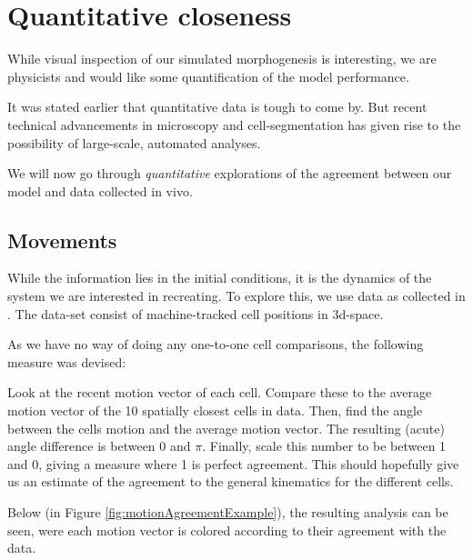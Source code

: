 \section{Quantitative closeness}
While visual inspection of our simulated morphogenesis is interesting, we are physicists and would like some quantification of the model performance.

It was stated earlier that quantitative data is tough to come by. But recent technical advancements in microscopy and cell-segmentation has given rise to the possibility of large-scale, automated analyses.\cite{stern2022deconstructing}

We will now go through \textit{quantitative} explorations of the agreement between our model and data collected in vivo. 


\subsection{Movements}

While the information lies in the initial conditions, it is the dynamics of the system we are interested in recreating. To explore this, we use data as collected in . 
The data-set consist of machine-tracked cell positions in 3d-space.

As we have no way of doing any one-to-one cell comparisons, the following measure was devised: 

Look at the recent motion vector of each cell. Compare these to the average motion vector of the 10 spatially closest cells in data. 
Then, find the angle between the cells motion and the average motion vector. The resulting (acute) angle difference is between 0 and $\pi$. Finally, scale this number to be between 1 and 0, giving a measure where 1 is perfect agreement.
This should hopefully give us an estimate of the agreement to the general kinematics for the different cells.

Below (in Figure  \ref{fig:motionAgreementExample}), the resulting analysis can be seen, were each motion vector is colored according to their agreement with the data.

